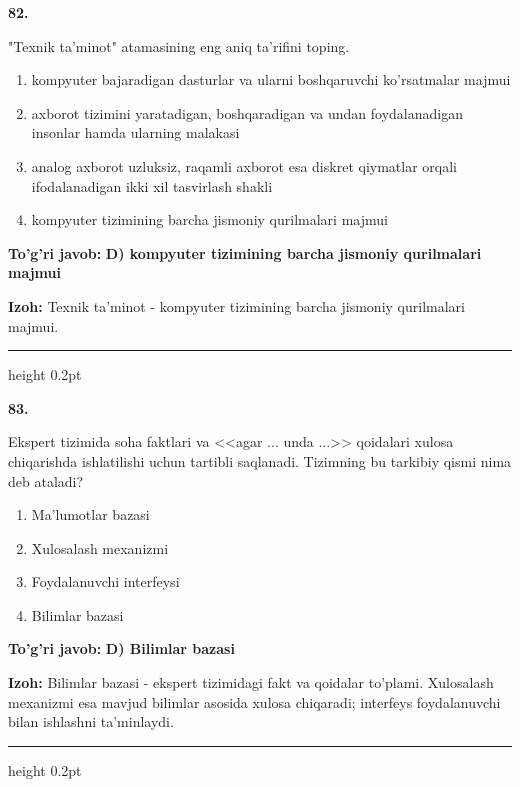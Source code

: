 \documentclass[10pt,a4paper,oneside]{article}
\begin{document}
\noindent\textbf{\color{ink}82.}
\par
"Texnik ta'minot" atamasining eng aniq ta'rifini toping.
\begin{enumerate}[label=\Alph*),leftmargin=9mm]
\item kompyuter bajaradigan dasturlar va ularni boshqaruvchi ko'rsatmalar majmui
\item axborot tizimini yaratadigan, boshqaradigan va undan foydalanadigan insonlar hamda ularning malakasi
\item analog axborot uzluksiz, raqamli axborot esa diskret qiymatlar orqali ifodalanadigan ikki xil tasvirlash shakli
\item kompyuter tizimining barcha jismoniy qurilmalari majmui
\end{enumerate}
\begin{tcolorbox}[enhanced,breakable,colback=teal!4,colframe=teal!50!black,boxrule=0.5pt,arc=1.1mm,left=3mm,right=3mm,top=1.7mm,bottom=1.7mm,before skip=2mm,after skip=2mm]
\textbf{\color{teal}To'g'ri javob:} \textbf{D) kompyuter tizimining barcha jismoniy qurilmalari majmui}
\par\smallskip
\textbf{Izoh:} Texnik ta'minot - kompyuter tizimining barcha jismoniy qurilmalari majmui.
\end{tcolorbox}
\vspace{2mm}\hrule height 0.2pt \vspace{3mm}

\noindent\textbf{\color{ink}83.}
\par
Ekspert tizimida soha faktlari va <<agar ... unda ...>> qoidalari xulosa chiqarishda ishlatilishi uchun tartibli saqlanadi. Tizimning bu tarkibiy qismi nima deb ataladi?
\begin{enumerate}[label=\Alph*),leftmargin=9mm]
\item Ma'lumotlar bazasi
\item Xulosalash mexanizmi
\item Foydalanuvchi interfeysi
\item Bilimlar bazasi
\end{enumerate}
\begin{tcolorbox}[enhanced,breakable,colback=teal!4,colframe=teal!50!black,boxrule=0.5pt,arc=1.1mm,left=3mm,right=3mm,top=1.7mm,bottom=1.7mm,before skip=2mm,after skip=2mm]
\textbf{\color{teal}To'g'ri javob:} \textbf{D) Bilimlar bazasi}
\par\smallskip
\textbf{Izoh:} Bilimlar bazasi - ekspert tizimidagi fakt va qoidalar to'plami. Xulosalash mexanizmi esa mavjud bilimlar asosida xulosa chiqaradi; interfeys foydalanuvchi bilan ishlashni ta'minlaydi.
\end{tcolorbox}
\vspace{2mm}\hrule height 0.2pt \vspace{3mm}
\end{document}
